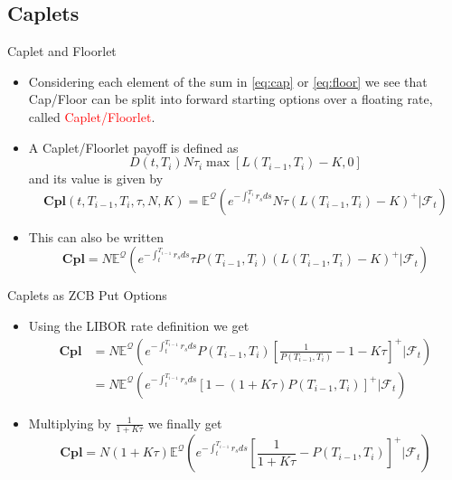 \documentclass{beamer}
\begin{document}
\subsection{Caplets}
\begin{frame}{Caplet and Floorlet}
	\begin{itemize}
		\item<1-> Considering each element of the sum in \cref{eq:cap} or \cref{eq:floor} we see that Cap/Floor can be split into forward starting options over a floating rate, called \textcolor{red}{Caplet/Floorlet}.
		\item<2-> A Caplet/Floorlet payoff is defined as
		\begin{equation*}
			D(t,T_i)N\tau_i\max\left[L(T_{i-1},T_i)-K,0\right]
		\end{equation*} 
		and its value is given by
		\begin{equation}
			\textbf{Cpl}(t,T_{i-1},T_i,\tau,N,K)=\mathbb{E}^{\mathcal{Q}}\left(e^{-\int_t^{T_i}r_s ds}N\tau(L(T_{i-1},T_i)-K)^+ | \mathcal{F}_t\right)
		\end{equation}
		\item<3-> This can also be written
		\begin{equation*}
			\textbf{Cpl}=N\mathbb{E}^{\mathcal{Q}}\left(e^{-\int_t^{T_{i-1}}r_s ds}\tau P(T_{i-1},T_i)(L(T_{i-1},T_i)-K)^+ | \mathcal{F}_t\right)
		\end{equation*}
	\end{itemize}
\end{frame}

\begin{frame}{Caplets as ZCB Put Options}
	\begin{itemize}
		\item<1-> Using the LIBOR rate definition we get
		\begin{equation*}
			\begin{aligned}
				\textbf{Cpl} &=N\mathbb{E}^{\mathcal{Q}}\left(e^{-\int_t^{T_{i-1}}r_s ds}P(T_{i-1},T_i)\left[\frac{1}{P(T_{i-1},T_i)}-1-K\tau\right]^+ \Big\rvert \mathcal{F}_t\right) \\
				& = 		N\mathbb{E}^{\mathcal{Q}}\left(e^{-\int_t^{T_{i-1}}r_s ds}\left[1-(1+K\tau)P(T_{i-1},T_i)\right]^+ | \mathcal{F}_t\right)
			\end{aligned}
		\end{equation*}
		\item<2-> Multiplying by $\frac{1}{1+K\tau}$ we finally get
		\begin{equation}
			\textbf{Cpl}=N(1+K\tau)\mathbb{E}^{\mathcal{Q}}\left(e^{-\int_t^{T_{i-1}}r_s ds}\left[\frac{1}{1+K\tau}-P(T_{i-1},T_i)\right]^+ \Big\rvert \mathcal{F}_t\right)
		\end{equation}
	\end{itemize}
\end{frame}
\end{document}
